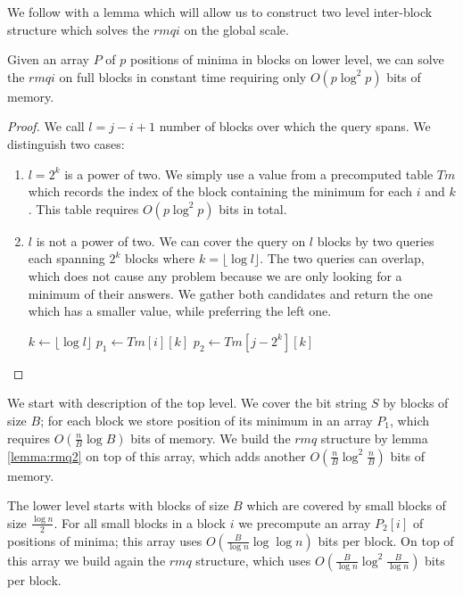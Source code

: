 We follow with a lemma which will allow us to construct two level inter-block structure which solves the $rmqi$ on the global scale.

\begin{lemma}\label{lemma:rmq2}
Given an array $P$ of $p$ positions of minima in blocks on lower level, we can solve the $rmqi$ on full blocks in constant time requiring only $O(p \log^2 p)$ bits of memory.
\end{lemma}
\begin{proof}
We call $l = j - i + 1$ number of blocks over which the query spans.
We distinguish two cases:
\begin{enumerate}
	\item $l = 2^k$ is a power of two.
	We simply use a value from a precomputed table $Tm$ which records the index of the block containing the minimum for each $i$ and $k$.
	This table requires $O(p \log^2 p)$ bits in total.
	\item $l$ is not a power of two.
	We can cover the query on $l$ blocks by two queries each spanning $2^k$ blocks where $k = \lfloor \log l \rfloor$.
	The two queries can overlap, which does not cause any problem because we are only looking for a minimum of their answers.
	We gather both candidates and return the one which has a smaller value, while preferring the left one.
	
	\begin{algorithmic}
		\State $k \gets \lfloor \log l \rfloor$
		\State $p_1 \gets Tm[i][k]$
		\State $p_2 \gets Tm[j-2^k][k]$
			\State {}
		\Else
			\State {}
		\EndIf
	\EndFunction
	\end{algorithmic}
\end{enumerate}
\end{proof}

We start with description of the top level.
We cover the bit string $S$ by blocks of size $B$; for each block we store position of its minimum in an array $P_1$, which requires $O(\frac{n}{B} \log B)$ bits of memory.
We build the $rmq$ structure by lemma \ref{lemma:rmq2} on top of this array, which adds another $O(\frac{n}{B} \log^2 \frac{n}{B})$ bits of memory.

The lower level starts with blocks of size $B$ which are covered by small blocks of size $\frac{\log n}{2}$.
For all small blocks in a block $i$ we precompute an array $P_2[i]$ of positions of minima; this array uses $O(\frac{B}{\log n} \log \log n)$ bits per block.
On top of this array we build again the $rmq$ structure, which uses $O(\frac{B}{\log n} \log^2 \frac{B}{\log n})$ bits per block.

